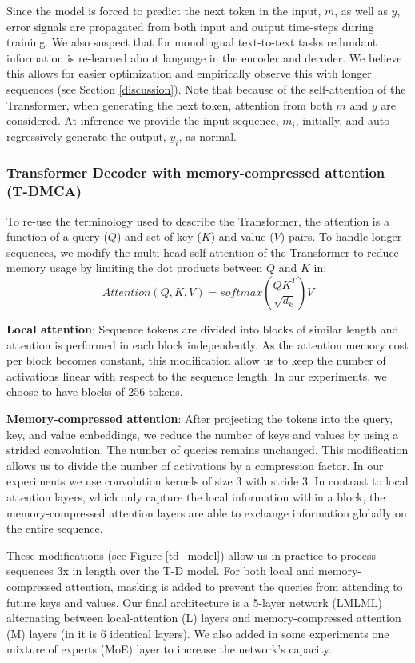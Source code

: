 Since the model is forced to predict the next token in the input, $m$, as well as $y$,
error signals are propagated from both input and output time-steps during training. We also
suspect that for monolingual text-to-text tasks redundant information is re-learned about language in the encoder and decoder. 
 We believe this allows for easier optimization and empirically observe this 
 with longer sequences (see Section \ref{discussion}).
 Note that because of the
 self-attention of the Transformer, when generating the next token, attention
 from both $m$ and $y$ are considered.
 At inference we provide the input sequence, $m_i$, initially, and auto-regressively generate the output, $y_i$, as normal.


\subsubsection{Transformer Decoder with memory-compressed attention (T-DMCA)} \label{t-dmca}
To re-use the terminology used to describe the Transformer,
the attention is a function of a query ($Q$) and set of key ($K$) and value ($V$) pairs.
To handle longer sequences, we modify the multi-head self-attention
of the Transformer to reduce memory usage
by limiting the dot products between $Q$ and $K$ in:
	\[Attention(Q, K, V) = softmax(\frac{QK^T}{\sqrt{d_k}}) V \]

\textbf{Local attention}: Sequence tokens are divided into blocks of similar length and 
    attention is performed in each block independently. As the attention memory cost per block 
    becomes constant, this modification allow us to keep the number of activations linear
    with respect to the sequence length. In our experiments, we choose to have blocks of 256 tokens.

\textbf{Memory-compressed attention}:
After projecting the tokens into the query, key, and value embeddings, we reduce the number of keys
and values by using a strided convolution. The number of queries remains unchanged.
This modification allows us to divide the number of activations by a compression factor.
In our experiments we use convolution kernels of size 3 with stride 3.
In contrast to local attention layers,
which only capture the local information within a block,
the memory-compressed attention layers are able to exchange information
globally on the entire sequence.

These modifications (see Figure \ref{td_model}) allow us in practice to process
sequences 3x in length over the T-D model.  For both local and memory-compressed attention, masking is added to prevent the queries from attending to future keys and values.
Our final architecture is a 5-layer network (LMLML) alternating between local-attention (L) layers and
memory-compressed attention (M) layers (in \citet{vaswani2017attention} it is 6 identical layers).
We also added in some experiments
one mixture of experts (MoE) layer \citep{shazeer2017outrageously}
to increase the network's capacity.


